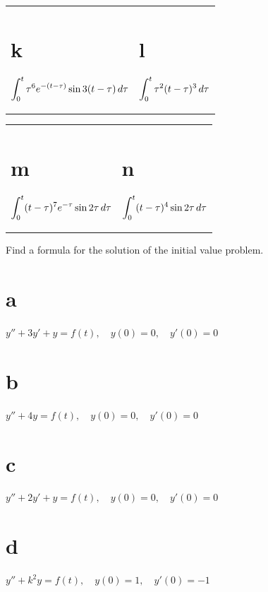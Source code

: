\begin{exerciselist}
\begin{description}
    \item
      \begin{tabular}[t]{@{}p{168pt}@{}p{168pt}}
        \part{k} $\displaystyle{\int_{0}^{t}\tau^{6} e^{-(t-\tau)}\sin3(t-\tau)\,d\tau}$ & \part{l} $\displaystyle{\int_{0}^{t}\tau^{2}(t-\tau)^{3}\, d\tau}$
      \end{tabular}

    \item
      \begin{tabular}[t]{@{}p{168pt}@{}p{168pt}}
        \part{m} $\displaystyle{\int_{0}^{t}(t-\tau)^{7}e^{-\tau} \sin2\tau\,d\tau}$ & \part{n} $\displaystyle{\int_{0}^{t}(t-\tau)^{4}\sin 2\tau\,d\tau}$
      \end{tabular}
  \end{description}

  \item\label{exer:8.6.3} Find a formula for the solution of the initial value problem.

  \begin{description}
    \item \part{a} $y''+3y'+y=f(t),\quad y(0)=0,\quad y'(0)=0$

    \item \part{b} $y''+4y=f(t),\quad y(0)=0,\quad y'(0)=0$

    \item \part{c} $y''+2y'+y=f(t),\quad y(0)=0,\quad y'(0)=0$

    \item \part{d} $y''+k^{2}y=f(t),\quad y(0)=1,\quad y'(0)=-1$


\end{description}
\end{exerciselist}
